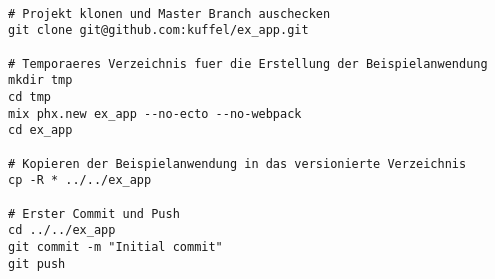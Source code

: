 \lstset{language=bash}
\begin{lstlisting}[frame=htrbl, caption={Projekt Setup}, label={lst:projekt_setup}]

# Projekt klonen und Master Branch auschecken
git clone git@github.com:kuffel/ex_app.git

# Temporaeres Verzeichnis fuer die Erstellung der Beispielanwendung
mkdir tmp
cd tmp
mix phx.new ex_app --no-ecto --no-webpack
cd ex_app

# Kopieren der Beispielanwendung in das versionierte Verzeichnis
cp -R * ../../ex_app

# Erster Commit und Push
cd ../../ex_app
git commit -m "Initial commit"
git push
\end{lstlisting}